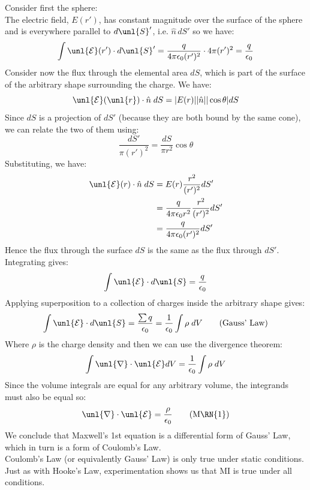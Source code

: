 \documentclass[a4paper, 11pt, normalem]{report}
\newcommand\E{\mathcal{E}}
\newcommand\uE{\unl{\E}}
\newcommand\del{\unl{\nabla}}
\newcommand\eno{\epsilon_0}
\newcommand\hn{\hat{n}}
\begin{document}
Consider first the sphere: \\
The electric field, $E(r')$, has constant magnitude over the surface of the sphere and is everywhere parallel to $d\unl{S}'$, i.e. $\hn\,dS'$ so we have:
\begin{equation}
    \int \uE(r') \cdot d\unl{S}' = \frac{q}{4\pi\eno(r')^2}\cdot 4\pi(r')^2 = \frac{q}{\eno}
\end{equation}
Consider now the flux through the elemental area $dS$, which is part of the surface of the arbitrary shape surrounding the charge.
We have:
\begin{equation}
    \uE(\unl{r})\cdot \hn\;dS = |E(r)||\hn||\cos\theta|dS
\end{equation}
Since $dS$ is a projection of $dS'$ (because they are both bound by the same cone), we can relate the two of them using:
\begin{equation}
    \frac{dS'}{\pi(r')^2} = \frac{dS}{\pi r^2}\cos\theta
\end{equation}
Substituting, we have:
\begin{align}
    \uE(r)\cdot\hn\;dS &= E(r)\frac{r^2}{(r')^2}dS' \\
    &= \frac{q}{4\pi\eno r^2}\frac{r^2}{(r')^2} dS' \\
    &= \frac{q}{4\pi\eno(r')^2}dS'
\end{align}
Hence the flux through the surface $dS$ is the same as the flux through $dS'$. \\
Integrating gives:
\begin{equation}
    \int \uE\cdot d\unl{S} = \frac{q}{\eno}
\end{equation}
Applying superposition to a collection of charges inside the arbitrary shape gives:
\begin{equation}
    \int \uE\cdot d\unl{S} = \frac{\sum q}{\eno} = \frac{1}{\eno}\int \rho\;dV \tag{Gauss' Law}
\end{equation}
Where $\rho$ is the charge density and then we can use the divergence theorem:
\begin{equation}
    \int \del \cdot \uE dV = \frac{1}{\eno} \int \rho\;dV
\end{equation}
Since the volume integrals are equal for any arbitrary volume, the integrands must also be equal so:
\begin{equation}
    \del \cdot \uE = \frac{\rho}{\eno} \tag{M\RN{1}}
\end{equation}
We conclude that Maxwell's 1st equation is a differential form of Gauss' Law, which in turn is a form of Coulomb's Law. \\
Coulomb's Law (or equivalently Gauss' Law) is only true under static conditions.
Just as with Hooke's Law, experimentation shows us that M\RN{1} is true under all conditions.
\end{document}
